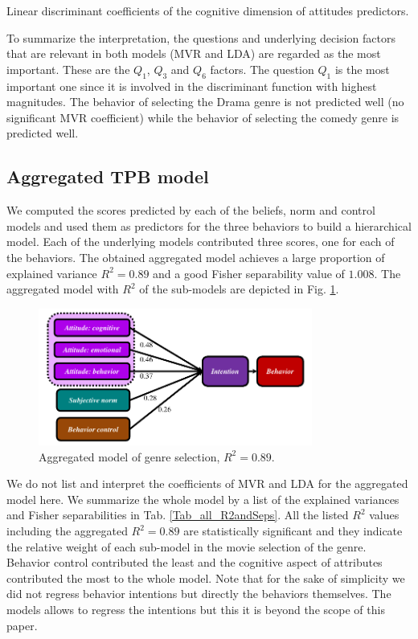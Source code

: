 \documentclass{llncs}
\begin{document}
\begin{table}[!h]
  \centering
   
  \caption{Linear discriminant coefficients of the cognitive dimension of attitudes predictors.}
  \label{Tab_attitudeCog_LDA}
\end{table}

To summarize the interpretation, the questions and underlying decision factors that are relevant in both models (MVR and LDA) are regarded as the most important. These are the $Q_1$, $Q_3$ and $Q_6$ factors. The question $Q_1$ is the most important one since it is involved in the discriminant function with highest magnitudes. The behavior of selecting the Drama genre is not predicted well (no significant MVR coefficient) while the behavior of selecting the comedy genre is predicted well. 

\subsection{Aggregated TPB model}\label{SubSec_AggregateModel}

We computed the scores predicted by each of the beliefs, norm and control models and used them as predictors for the three behaviors to build a hierarchical model. Each of the underlying models contributed three scores, one for each of the behaviors. The obtained aggregated model achieves a large proportion of explained variance $R^2=0.89$ and a good Fisher separability value of $1.008$. The aggregated model with $R^2$ of the sub-models are depicted in Fig. \ref{Fig_AggregModel}. 

 \begin{figure}[h!]
 \begin{center}
   \includegraphics[width=9cm]{TpbTopH.pdf}
   \caption[Fig_AggregModel]{Aggregated  model of genre selection, $R^2=0.89$.}
   \label{Fig_AggregModel}
 \end{center}
 \end{figure}


We do not list and interpret the coefficients of MVR and LDA for the aggregated model here. We summarize the whole model by a list of the explained variances and Fisher separabilities in Tab. \ref{Tab_all_R2andSeps}. All the listed $R^2$ values including the aggregated $R^2=0.89$ are statistically significant and they indicate the relative weight of each sub-model in the movie selection of the genre. Behavior control contributed the least and the cognitive aspect of attributes contributed the most to the whole model. Note that for the sake of simplicity we did not regress behavior intentions but directly the behaviors themselves. The models allows to regress the intentions but this it is beyond the scope of this paper. 
\end{document}

